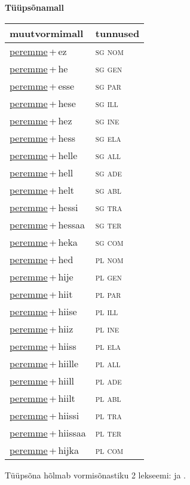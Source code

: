 
\vspace{1.8em}
\begin{minipage}{\textwidth}
\textbf{Tüüpsõnamall \,}\\

\begin{sideways}
\begin{tabular}{l l}
muutvormimall & tunnused \\
\hline
\underline{peremme}\,+\,ez & \textsc{ sg nom } \\
\underline{peremme}\,+\,he & \textsc{ sg gen } \\
\underline{peremme}\,+\,esse & \textsc{ sg par } \\
\underline{peremme}\,+\,hese & \textsc{ sg ill } \\
\underline{peremme}\,+\,hez & \textsc{ sg ine } \\
\underline{peremme}\,+\,hess & \textsc{ sg ela } \\
\underline{peremme}\,+\,helle & \textsc{ sg all } \\
\underline{peremme}\,+\,hell & \textsc{ sg ade } \\
\underline{peremme}\,+\,helt & \textsc{ sg abl } \\
\underline{peremme}\,+\,hessi & \textsc{ sg tra } \\
\underline{peremme}\,+\,hessaa & \textsc{ sg ter } \\
\underline{peremme}\,+\,heka & \textsc{ sg com } \\
\underline{peremme}\,+\,hed & \textsc{ pl nom } \\
\underline{peremme}\,+\,hije & \textsc{ pl gen } \\
\underline{peremme}\,+\,hiit & \textsc{ pl par } \\
\underline{peremme}\,+\,hiise & \textsc{ pl ill } \\
\underline{peremme}\,+\,hiiz & \textsc{ pl ine } \\
\underline{peremme}\,+\,hiiss & \textsc{ pl ela } \\
\underline{peremme}\,+\,hiille & \textsc{ pl all } \\
\underline{peremme}\,+\,hiill & \textsc{ pl ade } \\
\underline{peremme}\,+\,hiilt & \textsc{ pl abl } \\
\underline{peremme}\,+\,hiissi & \textsc{ pl tra } \\
\underline{peremme}\,+\,hiissaa & \textsc{ pl ter } \\
\underline{peremme}\,+\,hijka & \textsc{ pl com } \\
\end{tabular}
\end{sideways}
\label{tab:tüüpsõnamall-peremmeez}

\end{minipage}

 
\vspace{1em}
\noindent Tüüpsõna hõlmab vormisõnastiku 2 lekseemi:  ja .
